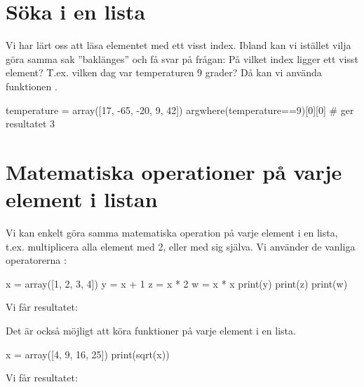 \section{Söka i en lista}\label{sec:findInList}

Vi har lärt oss att läsa elementet med ett visst index. Ibland kan vi istället vilja göra samma sak ''baklänges'' och få svar på frågan: På vilket index ligger ett visst element? T.ex. vilken dag var temperaturen 9 grader? Då kan vi använda funktionen .

\vspace{10pt}
\begin{python}
temperature = array([17, -65, -20, 9, 42])
argwhere(temperature==9)[0][0] # ger resultatet 3
\end{python}


\section{Matematiska operationer på varje element i listan}\label{sec:operationerpaenlista}

Vi kan enkelt göra samma matematiska operation på varje element i en lista, t.ex. multiplicera alla element med 2, eller med sig själva. Vi använder de vanliga operatorerna \cw{+ - * /}:

\begin{python}[caption={Matematiska operationer på varje element i listan},label={}]
x = array([1, 2, 3, 4])
y = x + 1
z = x * 2
w = x * x
print(y)
print(z)
print(w)
\end{python}

Vi får resultatet:

\vspace{10pt}
\begin{python}
[2 3 4 5]
[2 4 6 8]
[1 4 9 16]
\end{python}

Det är också möjligt att köra funktioner på varje element i en lista.

\begin{python}[caption={Köra funktioner på varje element i en lista},label={}]
x = array([4, 9, 16, 25])
print(sqrt(x))
\end{python}

Vi får resultatet:


